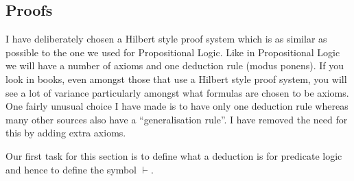 \documentclass[11pt]{article}
\newcommand{\proves}{\vdash}
\begin{document}
\subsection{Proofs}

I have deliberately chosen a Hilbert style proof system which is as similar as possible to the one we used for Propositional Logic. Like in Propositional Logic we will have a number of axioms and one deduction rule (modus ponens). If you look in books, even amongst those that use a Hilbert style proof system, you will see a lot of variance particularly amongst what formulas are chosen to be axioms. One fairly unusual choice I have made is to have only one deduction rule whereas many other sources also have a ``generalisation rule''. I have removed the need for this by adding extra axioms.

Our first task for this section is to define what a deduction is for predicate logic and hence to define the symbol $\proves$.
\end{document}
